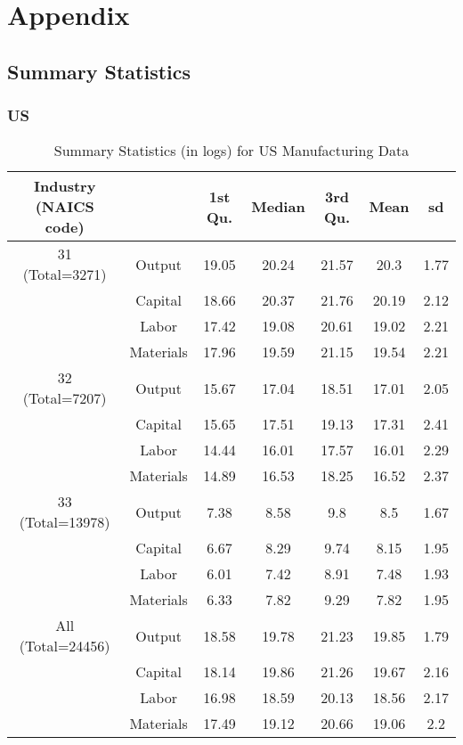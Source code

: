 \documentclass[11pt]{article}
\begin{document}



\section*{Appendix} \label{Appendix}
\subsection{Summary Statistics}
\subsubsection{US}
\begin{table}[H]
\centering
\caption{Summary Statistics (in logs) for US Manufacturing Data}
\begin{tabular}{ccccccc}
  \hline\hline Industry (NAICS code) &   & 1st Qu. & Median & 3rd Qu. & Mean & sd \\ 
  \hline
31 (Total=3271) & Output & 19.05 & 20.24 & 21.57 & 20.3 & 1.77 \\ 
   & Capital & 18.66 & 20.37 & 21.76 & 20.19 & 2.12 \\ 
   & Labor & 17.42 & 19.08 & 20.61 & 19.02 & 2.21 \\ 
   & Materials & 17.96 & 19.59 & 21.15 & 19.54 & 2.21 \\ 
  32 (Total=7207) & Output & 15.67 & 17.04 & 18.51 & 17.01 & 2.05 \\ 
   & Capital & 15.65 & 17.51 & 19.13 & 17.31 & 2.41 \\ 
   & Labor & 14.44 & 16.01 & 17.57 & 16.01 & 2.29 \\ 
   & Materials & 14.89 & 16.53 & 18.25 & 16.52 & 2.37 \\ 
  33 (Total=13978) & Output & 7.38 & 8.58 & 9.8 & 8.5 & 1.67 \\ 
   & Capital & 6.67 & 8.29 & 9.74 & 8.15 & 1.95 \\ 
   & Labor & 6.01 & 7.42 & 8.91 & 7.48 & 1.93 \\ 
   & Materials & 6.33 & 7.82 & 9.29 & 7.82 & 1.95 \\ 
  All (Total=24456) & Output & 18.58 & 19.78 & 21.23 & 19.85 & 1.79 \\ 
   & Capital & 18.14 & 19.86 & 21.26 & 19.67 & 2.16 \\ 
   & Labor & 16.98 & 18.59 & 20.13 & 18.56 & 2.17 \\ 
   & Materials & 17.49 & 19.12 & 20.66 & 19.06 & 2.2 \\ 
   \hline
\end{tabular}
\label{USsum}
\end{table}
\end{document}
